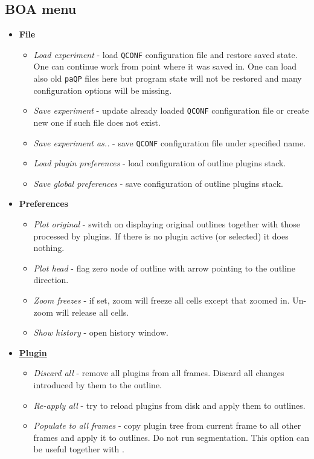 \documentclass[a4paper,12pt]{article}
\begin{document}
\subsection{BOA menu}
\label{sec:boaMenu}
\begin{itemize}
	\item \textbf{File}
	\begin{itemize}
		\item \textit{Load experiment} - load \texttt{QCONF} configuration file and restore saved state. One can continue work from point where it was saved in. One can load also old \texttt{paQP} files here but program state will not be restored and many configuration options will be missing.
		\item \textit{Save experiment} - update already loaded \texttt{QCONF} configuration file or create new one if such file does not exist.
		\item \textit{Save experiment as..} - save \texttt{QCONF} configuration file under specified name.
		\item \textit{Load plugin preferences} - load configuration of outline plugins stack.  
		\item \textit{Save global preferences} - save configuration of outline plugins stack.
	\end{itemize}
	\item \textbf{Preferences}
	\begin{itemize}
		\item \textit{Plot original} - switch on displaying original outlines together with those processed by plugins. If there is no plugin active (or selected) it does nothing.
		\item \textit{Plot head} - flag zero node of outline with arrow pointing to the outline direction.
		\item \textit{Zoom freezes} - if set, zoom will freeze all cells except that zoomed in. Un-zoom will release all cells.
		\item \textit{Show history} - open history window.
	\end{itemize}
	\item \hyperref[sec:boaFilters]{\textbf{Plugin}}
	\begin{itemize}
		\item \textit{Discard all} - remove all plugins from all frames. Discard all changes introduced by them to the outline.
		\item \textit{Re-apply all} - try to reload plugins from disk and apply them to outlines.
		\item \textit{Populate to all frames} - copy plugin tree from current frame to all other frames and apply it to  outlines. Do not run segmentation. This option can be useful together with .

\end{itemize}
\end{itemize}
\end{document}
